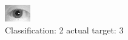 \begin{figure}[h!]
\begin{center}
\includegraphics[width=0.60\columnwidth]{figures/ID1112_class_2_target_3.png}
\end{center}
\caption{ Classification: 2 actual target: 3}
\label{fig:ID1112_class_2_target_3}
\end{figure}
